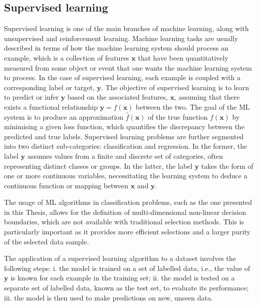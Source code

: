 \subsection{Supervised learning}
Supervised learning is one of the main branches of machine learning, along with unsupervised and reinforcement learning. Machine learning tasks are usually described in terms of how the machine learning system should process an example, which is a collection of features $\mathbf{x}$ that have been quantitatively measured from some object or event that one wants the machine learning system to process. In the case of supervised learning, each example is coupled with a corresponding label or target, $\mathbf{y}$. The objective of supervised learning is to learn to predict or infer $\mathbf{y}$ based on the associated features, $\mathbf{x}$, assuming that there exists a functional relationship $\mathbf{y} = f(\mathbf{x})$ between the two. The goal of the ML system is to produce an approximation $\widehat{f}(\mathbf{x})$ of the true function $f(\mathbf{x})$ by minimising a given loss function, which quantifies the discrepancy between the predicted and true labels. Supervised learning problems are further segmented into two distinct sub-categories: classification and regression. In the former, the label $\mathbf{y}$ assumes values from a finite and discrete set of categories, often representing distinct classes or groups. In the latter, the label $\mathbf{y}$ takes the form of one or more continuous variables, necessitating the learning system to deduce a continuous function or mapping between $\mathbf{x}$ and $\mathbf{y}$.

The usage of ML algorithms in classification problems, such as the one presented in this Thesis, allows for the definition of multi-dimensional non-linear decision boundaries, which are not available with traditional selection methods. This is particularly important as it provides more efficient selections and a larger purity of the selected data sample.

The application of a supervised learning algorithm to a dataset involves the following steps: i. the model is trained on a set of labelled data, i.e., the value of $\mathbf{y}$ is known for each example in the training set; ii. the model is tested on a separate set of labelled data, known as the test set, to evaluate its performance; iii. the model is then used to make predictions on new, unseen data.

